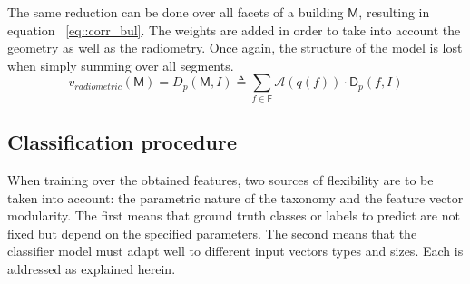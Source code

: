 \documentclass[runningheads]{llncs}
\begin{document}
The same reduction can be done over all facets of a building $\mathsf{M}$, resulting in equation ~\ref{eq::corr_bul}. The weights are added in order to take into account the geometry as well as the radiometry. Once again, the structure of the model is lost when simply summing over all segments.
\begin{equation}
	\label{eq::corr_bul}
	v_{radiometric}(\mathsf{M}) = D_p(\mathsf{M}, I) \triangleq \sum_{f \in \mathsf{F}} \mathscr{A}(q(f)) \cdot \mathsf{D}_p(f, I)
\end{equation}


\begin{figure}[H]
	\begin{center}
	\end{center}
\end{figure}

\subsection{Classification procedure}

When training over the obtained features, two sources of flexibility are to be taken into account: the parametric nature of the taxonomy and the feature vector modularity. The first means that ground truth classes or labels to predict are not fixed but depend on the specified parameters. The second means that the classifier model must adapt well to different input vectors types and sizes. Each is addressed as explained herein.
\end{document}
